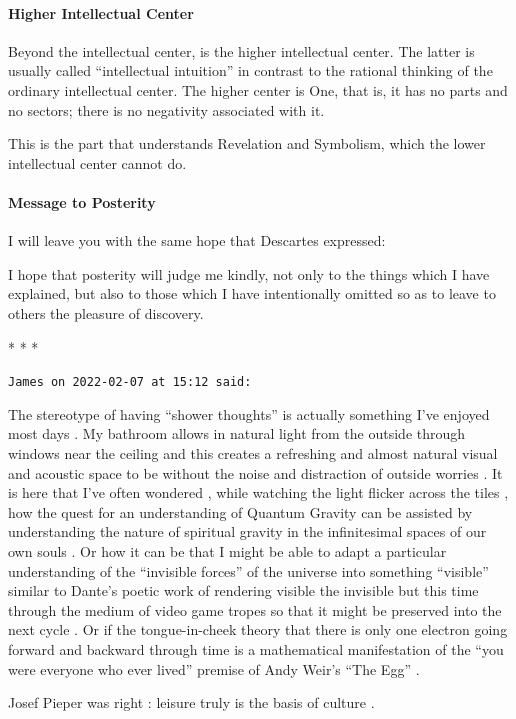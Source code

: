 \paragraph{Higher Intellectual Center}


Beyond the intellectual center, is the higher intellectual center. The latter is usually called ``intellectual intuition'' in contrast to the rational thinking of the ordinary intellectual center. The higher center is One, that is, it has no parts and no sectors; there is no negativity associated with it.

This is the part that understands Revelation and Symbolism, which the lower intellectual center cannot do.

\paragraph{Message to Posterity}


I will leave you with the same hope that Descartes expressed:

\begin{quotex}
I hope that posterity will judge me kindly, not only to the things which I have explained, but also to those which I have intentionally omitted so as to leave to others the pleasure of discovery.
\end{quotex}




\begin{center}* * *\end{center}

\begin{footnotesize}
\begin{sffamily}
\texttt{James on 2022-02-07 at 15:12 said:}

The stereotype of having ``shower thoughts'' is actually something I've enjoyed most days . My bathroom allows in natural light from the outside through windows near the ceiling and this creates a refreshing and almost natural visual and acoustic space to be without the noise and distraction of outside worries . It is here that I've often wondered , while watching the light flicker across the tiles , how the quest for an understanding of Quantum Gravity can be assisted by understanding the nature of spiritual gravity in the infinitesimal spaces of our own souls . Or how it can be that I might be able to adapt a particular understanding of the ``invisible forces'' of the universe into something ``visible'' similar to Dante's poetic work of rendering visible the invisible but this time through the medium of video game tropes so that it might be preserved into the next cycle . Or if the tongue-in-cheek theory that there is only one electron going forward and backward through time is a mathematical manifestation of the ``you were everyone who ever lived'' premise of Andy Weir's ``The Egg'' .

Josef Pieper was right : leisure truly is the basis of culture .

\end{sffamily}
\end{footnotesize}

